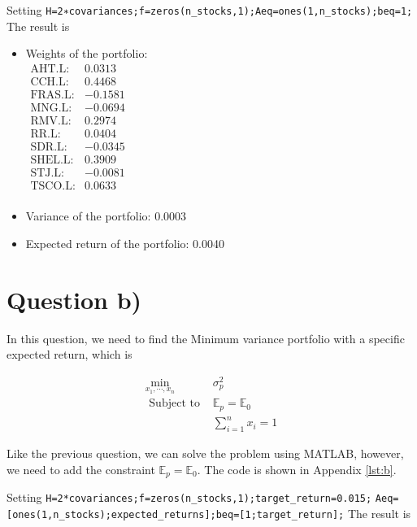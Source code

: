 \documentclass[12pt]{article}
\begin{document}
Setting \verb|H=2∗covariances;f=zeros(n_stocks,1);Aeq=ones(1,n_stocks);beq=1;|
The result is

\begin{itemize}
    \item Weights of the portfolio: \\ \(
          \begin{array}{rr}
              \text{AHT.L:}  & 0.0313  \\
              \text{CCH.L:}  & 0.4468  \\
              \text{FRAS.L:} & -0.1581 \\
              \text{MNG.L:}  & -0.0694 \\
              \text{RMV.L:}  & 0.2974  \\
              \text{RR.L:}   & 0.0404  \\
              \text{SDR.L:}  & -0.0345 \\
              \text{SHEL.L:} & 0.3909  \\
              \text{STJ.L:}  & -0.0081 \\
              \text{TSCO.L:} & 0.0633  \\
          \end{array}
          \)
    \item Variance of the portfolio: 0.0003
    \item Expected return of the portfolio: 0.0040
\end{itemize}

\section{Question b)}

In this question, we need to find the Minimum variance portfolio with a
specific expected return, which is

\[\begin{aligned}
        \min _{x_1, \cdots, x_n} & \sigma_p^2                \\
        \text { Subject to }     & \mathbb{E}_p=\mathbb{E}_0 \\
                                 & \sum_{i=1}^n x_i=1
    \end{aligned}\]

Like the previous question, we can solve the problem using MATLAB, however, we
need to add the constraint \(\mathbb{E}_p=\mathbb{E}_0\). The code is shown in
Appendix \ref{lst:b}.

Setting \verb|H=2*covariances;f=zeros(n_stocks,1);target_return=0.015;|
\verb|Aeq=[ones(1,n_stocks);expected_returns];beq=[1;target_return];| The
result is
\end{document}
